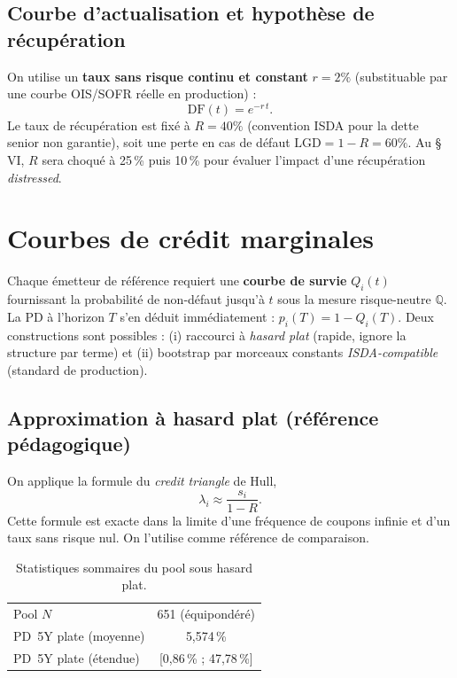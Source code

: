 \documentclass[11pt,a4paper]{article}
\newcommand{\Mes}{\mathbb{Q}}
\newcommand{\LGD}{\mathrm{LGD}}
\newcommand{\DF}{\mathrm{DF}}
\begin{document}
\subsection{Courbe d'actualisation et hypothèse de récupération}
On utilise un \textbf{taux sans risque continu et constant} $r = 2\%$ (substituable
par une courbe OIS/SOFR réelle en production) :
\begin{equation}
\DF(t) = e^{-r\,t}.
\end{equation}
Le taux de récupération est fixé à $R = 40\%$ (convention ISDA pour la dette senior
non garantie), soit une perte en cas de défaut $\LGD = 1 - R = 60\%$. Au § VI, $R$
sera choqué à 25\,\% puis 10\,\% pour évaluer l'impact d'une récupération
\emph{distressed}.

\section{Courbes de crédit marginales}\label{sec:credit_curves}

Chaque émetteur de référence requiert une \textbf{courbe de survie} $Q_i(t)$
fournissant la probabilité de non-défaut jusqu'à $t$ sous la mesure risque-neutre
$\Mes$. La PD à l'horizon $T$ s'en déduit immédiatement : $p_i(T) = 1 - Q_i(T)$.
Deux constructions sont possibles : (i) raccourci à \emph{hasard plat} (rapide,
ignore la structure par terme) et (ii) bootstrap par morceaux constants
\emph{ISDA-compatible} (standard de production).

\subsection{Approximation à hasard plat (référence pédagogique)}
On applique la formule du \emph{credit triangle} de Hull,
\begin{equation}
\lambda_i \approx \frac{s_i}{1 - R}.
\label{eq:credit_triangle}
\end{equation}
Cette formule est exacte dans la limite d'une fréquence de coupons infinie et d'un
taux sans risque nul. On l'utilise comme référence de comparaison.

\begin{table}[H]
\centering
\begin{tabular}{lc}
\toprule
Pool $N$                       & 651 (équipondéré) \\
PD~5Y plate (moyenne)          & 5,574\,\% \\
PD~5Y plate (étendue)          & [0,86\,\% ; 47,78\,\%] \\
\bottomrule
\end{tabular}
\caption{Statistiques sommaires du pool sous hasard plat.}
\end{table}
\end{document}
